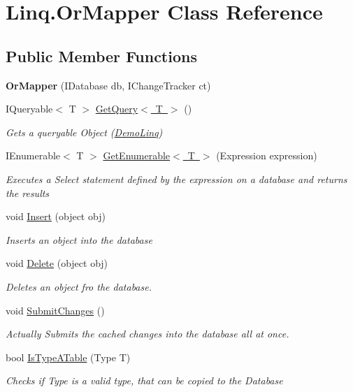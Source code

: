 \hypertarget{class_linq_1_1_or_mapper}{}\section{Linq.\+Or\+Mapper Class Reference}
\label{class_linq_1_1_or_mapper}
\subsection*{Public Member Functions}
\begin{DoxyCompactItemize}
\item 
\mbox{\label{class_linq_1_1_or_mapper_af7c792c7adaaa4dc9bddb28a6b76510e}} 
{\bfseries Or\+Mapper} (I\+Database db, I\+Change\+Tracker ct)
\item 
I\+Queryable$<$ T $>$ \mbox{\hyperlink{class_linq_1_1_or_mapper_a61b69ea249addd0ee7c4a3e9e69022ab}{Get\+Query$<$ T $>$}} ()
\begin{DoxyCompactList}\small\item\em Gets a queryable Object (\mbox{\hyperlink{class_linq_1_1_demo_linq}{Demo\+Linq}}) \end{DoxyCompactList}\item 
I\+Enumerable$<$ T $>$ \mbox{\hyperlink{class_linq_1_1_or_mapper_a1bdf8dd049f5bbe6f4b89c22b729f4fd}{Get\+Enumerable$<$ T $>$}} (Expression expression)
\begin{DoxyCompactList}\small\item\em Executes a Select statement defined by the expression on a database and returns the results \end{DoxyCompactList}\item 
void \mbox{\hyperlink{class_linq_1_1_or_mapper_a77fcb2b43afdc48a72f6356fc063a8c2}{Insert}} (object obj)
\begin{DoxyCompactList}\small\item\em Inserts an object into the database \end{DoxyCompactList}\item 
void \mbox{\hyperlink{class_linq_1_1_or_mapper_a0a5f2100a6da15713a55ed3d972b8434}{Delete}} (object obj)
\begin{DoxyCompactList}\small\item\em Deletes an object fro the database. \end{DoxyCompactList}\item 
void \mbox{\hyperlink{class_linq_1_1_or_mapper_a447b6b90b25be80634149e945c686461}{Submit\+Changes}} ()
\begin{DoxyCompactList}\small\item\em Actually Submits the cached changes into the database all at once. \end{DoxyCompactList}\item 
bool \mbox{\hyperlink{class_linq_1_1_or_mapper_a9fb4865eedaba32daf32f65874779a60}{Is\+Type\+A\+Table}} (Type T)
\begin{DoxyCompactList}\small\item\em Checks if Type is a valid type, that can be copied to the Database \end{DoxyCompactList}\end{DoxyCompactItemize}


